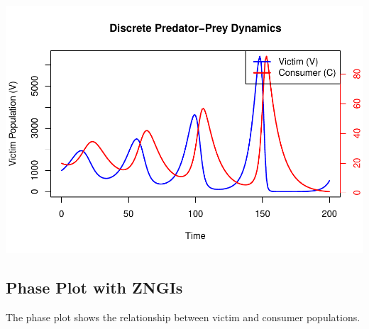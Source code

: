 \documentclass[
  a4paper]{book}
\begin{document}
\includegraphics{BB512_files/figure-latex/DT-population-dynamics-1.pdf}

\subsection{Phase Plot with ZNGIs}\label{phase-plot-with-zngis-1}

The phase plot shows the relationship between victim and consumer populations.
\end{document}
